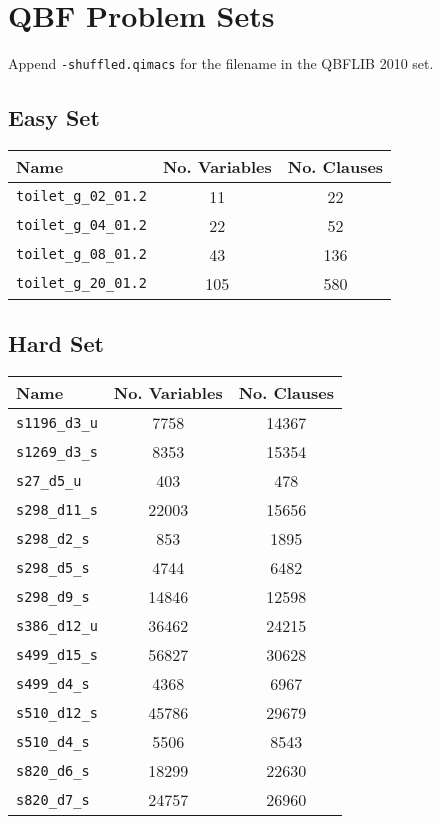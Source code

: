 \chapter{QBF Problem Sets} \label{qbfproblemsets}

Append \texttt{-shuffled.qimacs} for the filename in the QBFLIB 2010 set.

\section{Easy Set}

\begin{center}
\begin{tabular}{| l | c | c |}
\hline
\textbf{Name} & \textbf{No. Variables} & \textbf{No. Clauses} \\ \hline
\texttt{toilet\_g\_02\_01.2} & 11 & 22 \\
\texttt{toilet\_g\_04\_01.2} & 22 & 52 \\
\texttt{toilet\_g\_08\_01.2} & 43 & 136 \\
\texttt{toilet\_g\_20\_01.2} & 105 & 580 \\
\hline
\end{tabular}
\end{center}

\section{Hard Set}

\begin{center}
\begin{tabular}{| l | c | c |}
\hline
\textbf{Name} & \textbf{No. Variables} & \textbf{No. Clauses} \\ \hline
\texttt{s1196\_d3\_u} & 7758 & 14367 \\
\texttt{s1269\_d3\_s} & 8353 & 15354 \\
\texttt{s27\_d5\_u} & 403 & 478 \\
\texttt{s298\_d11\_s} & 22003 & 15656 \\
\texttt{s298\_d2\_s} & 853 & 1895 \\
\texttt{s298\_d5\_s} & 4744 & 6482 \\
\texttt{s298\_d9\_s} & 14846 & 12598 \\
\texttt{s386\_d12\_u} & 36462 & 24215 \\
\texttt{s499\_d15\_s} & 56827 & 30628 \\
\texttt{s499\_d4\_s} & 4368 & 6967 \\
\texttt{s510\_d12\_s} & 45786 & 29679 \\
\texttt{s510\_d4\_s} & 5506 & 8543 \\
\texttt{s820\_d6\_s} & 18299 & 22630 \\
\texttt{s820\_d7\_s} & 24757 & 26960 \\
\hline
\end{tabular}
\end{center}
